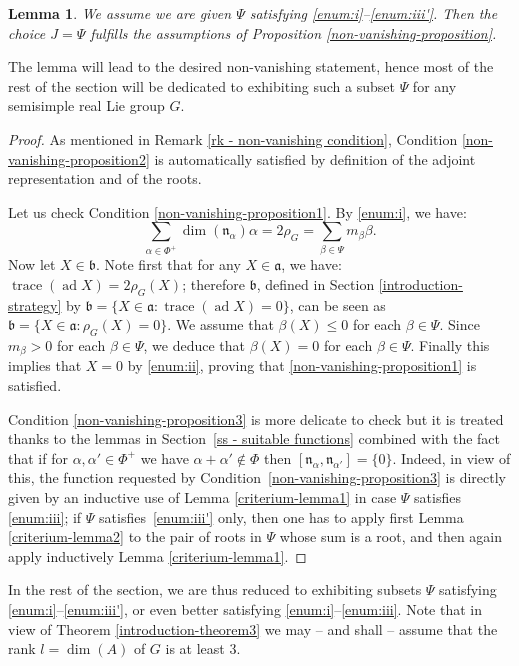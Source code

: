 \documentclass[JEP,XML,SOM,Unicode,published]{cedram}
\newcommand{\fra}{\mathfrak{a}}
\newcommand{\frb}{\mathfrak{b}}
\newcommand{\frn}{\mathfrak{n}}
\theoremstyle{plain}
\newtheorem{lemma}[equation]{Lemma}
\theoremstyle{remark}
\theoremstyle{definition}
\DeclareMathOperator{\ad}{ad}
\DeclareMathOperator{\trace}{trace}
\begin{document}
\begin{lemma}
\label{lemma - ss OK}
We assume we are given $\Psi$ satisfying \eqref{enum:i}--\eqref{enum:iii'}.
Then the choice $J = \Psi$ fulfills the assumptions of Proposition \ref{non-vanishing-proposition}.
\end{lemma}

The lemma will lead to the desired non-vanishing statement, hence most of the rest of the section will be dedicated to exhibiting such a subset $\Psi$ for any semisimple
real Lie group $G$.

\begin{proof}
As mentioned in Remark \ref{rk - non-vanishing condition}, Condition \eqref{non-vanishing-proposition2} is automatically satisfied by definition of the adjoint representation and of the roots.

Let us check Condition \eqref{non-vanishing-proposition1}.
By \eqref{enum:i}, we have:
\[
\sum_{\alpha \in \Phi^+} \dim(\frn_\alpha) \alpha = 2 \rho_G = \sum_{\beta \in \Psi} m_\beta \beta.
\]
Now let $X \in \frb$.
Note first that for any $X \in \fra$, we have: $\trace(\ad X) = 2 \rho_G(X)$; therefore $\frb$, defined in Section \ref{introduction-strategy} by
$\frb=\{X \in \fra: \trace(\ad X) = 0\}$, can be seen as $\frb=\{X \in \fra: \rho_G(X) = 0\}$.
We assume that $\beta(X) \leqslant 0$ for each $\beta \in \Psi$.
Since $m_\beta > 0$ for each $\beta \in \Psi$, we deduce that $\beta(X)=0$ for each $\beta \in \Psi$.
Finally this implies that $X=0$ by \eqref{enum:ii}, proving that \eqref{non-vanishing-proposition1} is satisfied.

Condition \eqref{non-vanishing-proposition3} is more delicate to check but it is treated thanks to the lemmas in Section~\ref{ss - suitable functions} combined with the fact that if for $\alpha, \alpha' \in \Phi^+$ we have $\alpha + \alpha' \not\in \Phi$ then $[\frn_\alpha,\frn_{\alpha'}]=\{ 0 \}$.
Indeed, in view of this, the function requested by Condition~\eqref{non-vanishing-proposition3} is directly given by an inductive use of Lemma \ref{criterium-lemma1} in case $\Psi$ satisfies \eqref{enum:iii}; if $\Psi$ satisfies~\eqref{enum:iii'} only, then one has to apply first Lemma \ref{criterium-lemma2} to the pair of roots in $\Psi$ whose sum is a root, and then again apply inductively Lemma \ref{criterium-lemma1}.
\end{proof}

In the rest of the section, we are thus reduced to exhibiting subsets $\Psi$ satisfying \eqref{enum:i}--\eqref{enum:iii'}, or even better satisfying \eqref{enum:i}--\eqref{enum:iii}.
Note that in view of Theorem \ref{introduction-theorem3} we may -- and shall -- assume that the rank $l = \dim(A)$ of $G$ is at least $3$.
\end{document}
